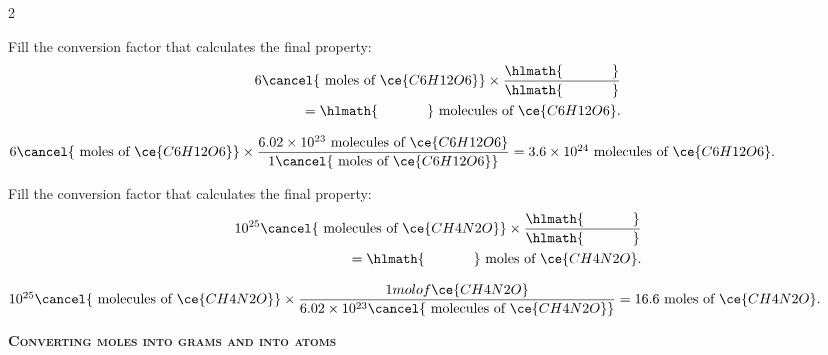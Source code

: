 \documentclass[main.tex]{subfiles}
\begin{document}
\begin{multicols*}{2}
\begin{question}[ID=\the\value{numA}]
Fill the conversion factor that calculates the final property:
 \begin{equation*}\begin{split}
6\cancel{\text{ moles of }\ce{C6H12O6}} \times \dfrac{\hlmath{\hspace{35pt}}}{\hlmath{\hspace{35pt}}}\\
=\hlmath{\hspace{35pt}}\text{ molecules of }\ce{C6H12O6}.
\end{split}\end{equation*}
\end{question}
\begin{solution}
$
6\cancel{\text{ moles of }\ce{C6H12O6}} \times \dfrac{   6.02\times 10^{23}  \text{ molecules of }\ce{C6H12O6}    }{   1\cancel{\text{ moles of }\ce{C6H12O6}}    }
=  3.6\times 10^{24}   \text{ molecules of }\ce{C6H12O6}.
$
\hspace{0.1cm}\end{solution}%
\begin{question}[ID=\the\value{numA}]
Fill the conversion factor that calculates the final property:
 \begin{equation*}\begin{split}
10^{25}\cancel{\text{ molecules of }\ce{CH4N2O}} \times \dfrac{\hlmath{\hspace{35pt}}}{\hlmath{\hspace{35pt}}}\\
=\hlmath{\hspace{35pt}}\text{ moles of }\ce{CH4N2O}.
\end{split}\end{equation*}
\end{question}
\begin{solution}
$
10^{25}\cancel{\text{ molecules of }\ce{CH4N2O}} \times \dfrac{   1 mol of \ce{CH4N2O}}{   6.02\times 10^{23}\cancel{\text{ molecules of }\ce{CH4N2O}}     }
= 16.6\text{ moles of }\ce{CH4N2O}.
$
\hspace{0.1cm}\end{solution}%


{\raggedright\textsc{\textbf{Converting moles into grams and into atoms }}\par}



\end{multicols*}
\end{document}
